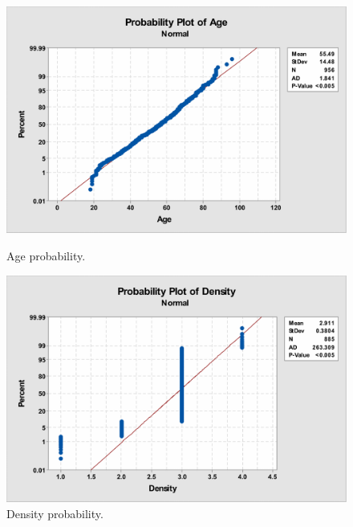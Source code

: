 \documentclass[12pt]{article}
\begin{document}
    \begin{figure}[H]
      \centering
      \begin{minipage}[b]{0.45\textwidth}
        \includegraphics[width=\textwidth]{age-probability}
        \caption{Age probability.}
        \label{fig:age-probability}
      \end{minipage}
      \hfill
      \begin{minipage}[b]{0.45\textwidth}
        \includegraphics[width=\textwidth]{density-probability}
        \caption{Density probability.}
        \label{fig:density-probability}
      \end{minipage}
    \end{figure}
\end{document}

